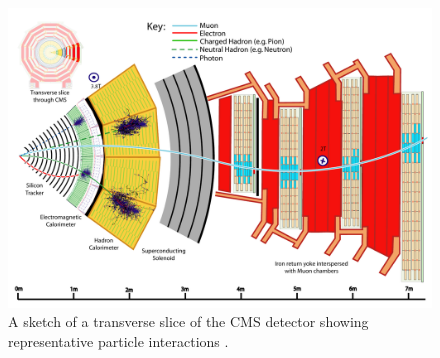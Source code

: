 \begin{figure}[hbtp]
\centering
\includegraphics[scale=0.5]{figures/lhc_and_cms/cms_slice.pdf}
\caption{A sketch of a transverse slice of the CMS detector showing representative particle interactions \cite{cms_pf}.}
\label{cms_slice}
\end{figure}